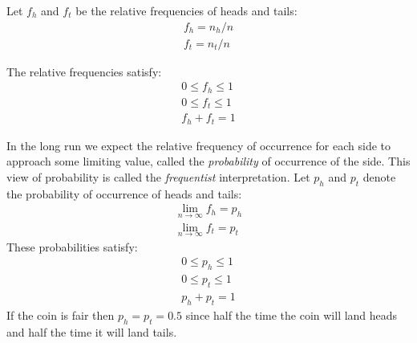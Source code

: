 \documentclass{article}
\begin{document}
Let $f_h$ and $f_t$ be the relative frequencies of heads and tails:
\begin{eqnarray}
	f_h = n_h / n \\
	f_t = n_t / n
\end{eqnarray}

The relative frequencies satisfy:
\begin{eqnarray}
	0 \le f_h \le 1 \\
	0 \le f_t \le 1 \\
	f_h + f_t = 1
\end{eqnarray}

In the long run we expect the relative frequency of occurrence for each side to approach some limiting value, called the {\it probability}
of occurrence of the side.
This view of probability is called the {\it frequentist} interpretation.
Let $p_h$ and $p_t$ denote the probability of occurrence of heads and tails:
\begin{eqnarray}
	\lim_{n \rightarrow \infty} f_h = p_h \\
	\lim_{n \rightarrow \infty} f_t = p_t
\end{eqnarray}
These probabilities satisfy:
\begin{eqnarray}
	0 \le p_h \le 1 \\
	0 \le p_t \le 1 \\
	p_h + p_t = 1
\end{eqnarray}
If the coin is fair then $p_h = p_t = 0.5$ since half the time the coin will land heads and half the time it will land tails. 

\newcommand{\real}{\mathbb{R}}


\newcommand{\realzero}{0}

\newcommand{\realone}{1}


\newcommand{\reallt}{<}
\newcommand{\realleq}{\leq}
\newcommand{\realgt}{>}
\newcommand{\realgeq}{\geq}

\end{document}
